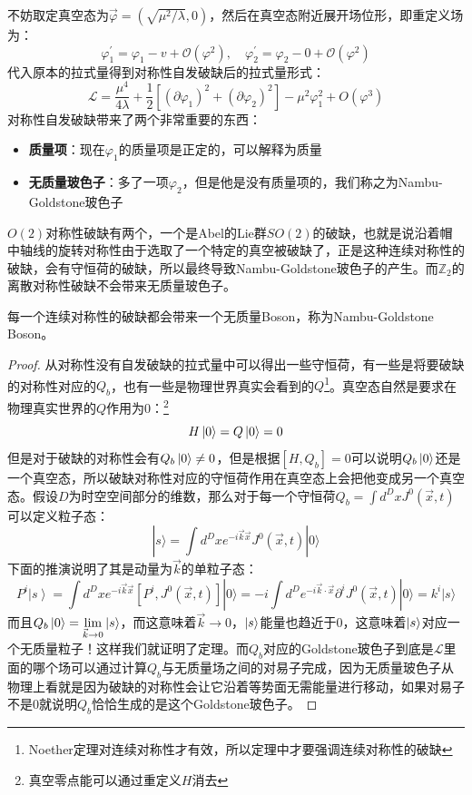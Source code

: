 不妨取定真空态为$\vec{\varphi}=(\sqrt{\mu^2/\lambda},0)$，然后在真空态附近展开场位形，即重定义场为：
\begin{equation}
	\varphi_1^\prime=\varphi_1-v+\mathcal{O}(\varphi^2),\quad \varphi_2^\prime=\varphi_2-0+\mathcal{O}(\varphi^2)
\end{equation}
代入原本的拉式量得到对称性自发破缺后的拉式量形式：
\begin{equation}
	\mathcal{L}=\frac{\mu^4}{4\lambda}+\frac{1}{2}\left[(\partial\varphi_1)^2+(\partial\varphi_2)^2\right]-\mu^2\varphi_1^2+O(\varphi^3)
\end{equation}
对称性自发破缺带来了两个非常重要的东西：
\begin{itemize}
	\item \textbf{质量项}：现在$\varphi_1$的质量项是正定的，可以解释为质量
	\item \textbf{无质量玻色子}：多了一项$\varphi_2$，但是他是没有质量项的，我们称之为Nambu-Goldstone玻色子
\end{itemize}
$O(2)$对称性破缺有两个，一个是Abel的Lie群$SO(2)$的破缺，也就是说沿着帽中轴线的旋转对称性由于选取了一个特定的真空被破缺了，正是这种连续对称性的破缺，会有守恒荷的破缺，所以最终导致Nambu-Goldstone玻色子的产生。而$\mathbb{Z}_2$的离散对称性破缺不会带来无质量玻色子。
\begin{theorem}
	每一个连续对称性的破缺都会带来一个无质量Boson，称为Nambu-Goldstone Boson。
\end{theorem}
\begin{proof}
	从对称性没有自发破缺的拉式量中可以得出一些守恒荷，有一些是将要破缺的对称性对应的$Q_b$，也有一些是物理世界真实会看到的$Q$\footnote{Noether定理对连续对称性才有效，所以定理中才要强调连续对称性的破缺}。真空态自然是要求在物理真实世界的$Q$作用为0：\footnote{真空零点能可以通过重定义$H$消去}
	\begin{equation}
		H\ket{0}=Q\ket{0}=0
	\end{equation}
	但是对于破缺的对称性会有$Q_b\ket{0}\neq0$，但是根据$[H,Q_b]=0$可以说明$Q_b\ket{0}$还是一个真空态，所以破缺对称性对应的守恒荷作用在真空态上会把他变成另一个真空态。假设$D$为时空空间部分的维数，那么对于每一个守恒荷$Q_b=\int d^DxJ^0(\vec{x},t)$可以定义粒子态：
	\begin{equation}
		|s\rangle=\int d^{D}xe^{-i\vec{k}\vec{x}}J^{0}(\vec{x},t)|0\rangle 
	\end{equation}
	下面的推演说明了其是动量为$\vec{k}$的单粒子态：
	\begin{equation}
		P^{i}\left|s\right\rangle=\int d^{D}xe^{-i\vec{k}\vec{x}}[P^{i},J^{0}(\vec{x},t)]|0\rangle=-i\int d^{D}e^{-i\vec{k}\cdot\vec{x}}\partial^{i}J^{0}(\vec{x},t)|0\rangle=k^{i}|s\rangle 
	\end{equation}
	而且$Q_b\ket{0}=\lim\limits_{\vec{k}\to0}\ket{s}$，而这意味着$\vec{k}\to0$，$\ket{s}$能量也趋近于0，这意味着$\ket{s}$对应一个无质量粒子！这样我们就证明了定理。而$Q_b$对应的Goldstone玻色子到底是$\mathcal{L}$里面的哪个场可以通过计算$Q_b$与无质量场之间的对易子完成，因为无质量玻色子从物理上看就是因为破缺的对称性会让它沿着等势面无需能量进行移动，如果对易子不是0就说明$Q_b$恰恰生成的是这个Goldstone玻色子。
\end{proof}
